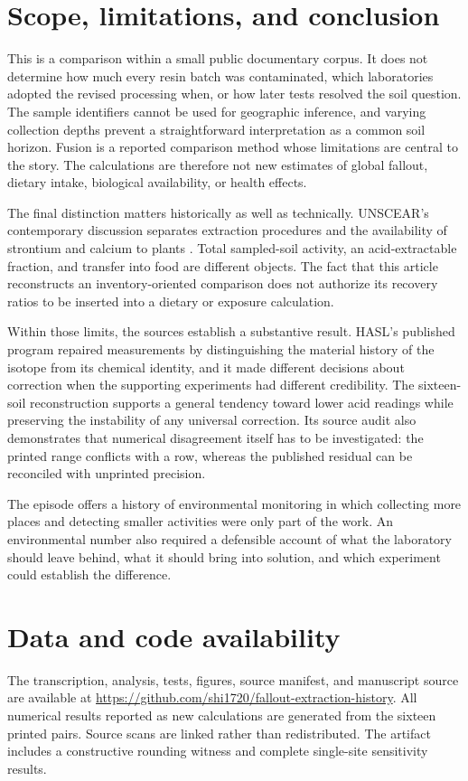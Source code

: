 \documentclass[11pt,a4paper]{article}
\begin{document}
\section{Scope, limitations, and conclusion}
This is a comparison within a small public documentary corpus. It does not determine how much every resin batch was contaminated, which laboratories adopted the revised processing when, or how later tests resolved the soil question. The sample identifiers cannot be used for geographic inference, and varying collection depths prevent a straightforward interpretation as a common soil horizon. Fusion is a reported comparison method whose limitations are central to the story. The calculations are therefore not new estimates of global fallout, dietary intake, biological availability, or health effects.

The final distinction matters historically as well as technically. UNSCEAR's contemporary discussion separates extraction procedures and the availability of strontium and calcium to plants \citep[Annex F, Part II, paras.~17--20]{unscear1962}. Total sampled-soil activity, an acid-extractable fraction, and transfer into food are different objects. The fact that this article reconstructs an inventory-oriented comparison does not authorize its recovery ratios to be inserted into a dietary or exposure calculation.

Within those limits, the sources establish a substantive result. HASL's published program repaired measurements by distinguishing the material history of the isotope from its chemical identity, and it made different decisions about correction when the supporting experiments had different credibility. The sixteen-soil reconstruction supports a general tendency toward lower acid readings while preserving the instability of any universal correction. Its source audit also demonstrates that numerical disagreement itself has to be investigated: the printed range conflicts with a row, whereas the published residual can be reconciled with unprinted precision.

The episode offers a history of environmental monitoring in which collecting more places and detecting smaller activities were only part of the work. An environmental number also required a defensible account of what the laboratory should leave behind, what it should bring into solution, and which experiment could establish the difference.

\section*{Data and code availability}
The transcription, analysis, tests, figures, source manifest, and manuscript source are available at \url{https://github.com/shi1720/fallout-extraction-history}. All numerical results reported as new calculations are generated from the sixteen printed pairs. Source scans are linked rather than redistributed. The artifact includes a constructive rounding witness and complete single-site sensitivity results.
\end{document}
